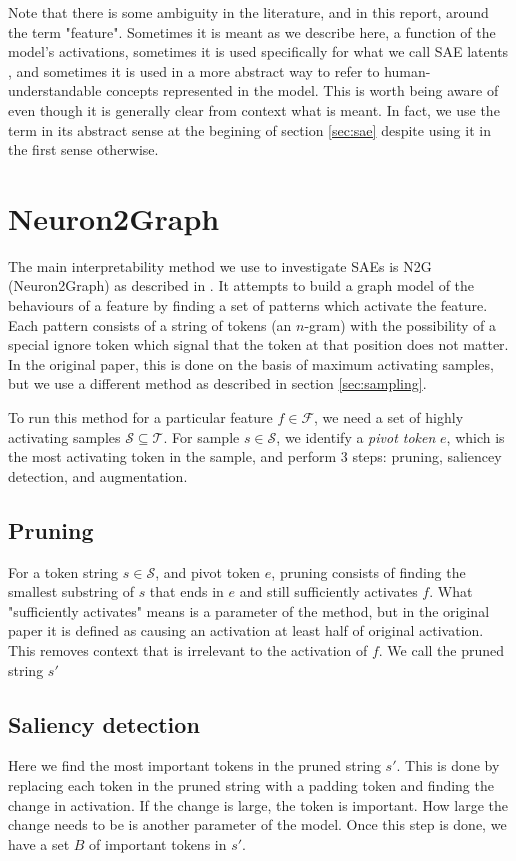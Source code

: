 Note that there is some ambiguity in the literature, and in this report, around the term "feature".
Sometimes it is meant as we describe here, a function of the model's activations, sometimes it is used specifically for what we call SAE latents \parencite{templeton_scaling_2024}, and sometimes it is used in a more abstract way to refer to human-understandable concepts represented in the model.
This is worth being aware of even though it is generally clear from context what is meant.
In fact, we use the term in its abstract sense at the begining of section \ref{sec:sae} despite using it in the first sense otherwise.

\section{Neuron2Graph}
\label{sec:n2g}
The main interpretability method we use to investigate SAEs is N2G (Neuron2Graph)
as described in \cite{foote_neuron_2023}.
It attempts to build a graph model of the behaviours of a feature 
by finding a set of patterns which activate the feature.
Each pattern consists of a string of tokens (an $n$-gram) 
with the possibility of a special ignore token 
which signal that the token at that position does not matter.
In the original paper, this is done on the basis of maximum activating samples, but we use a different method as described in section \ref{sec:sampling}.

To run this method for a particular feature $f\in\mathcal{F}$, 
we need a set of highly activating samples $\mathcal S\subseteq \mathcal T$.
For sample $s\in\mathcal S$, we identify a \emph{pivot token} $e$, 
which is the most activating token in the sample, 
and perform 3 steps: pruning, saliencey detection, and augmentation.

\subsection{Pruning}
For a token string $s\in\mathcal S$, and pivot token $e$, 
pruning consists of finding the smallest substring of $s$ that ends in $e$ 
and still sufficiently activates $f$.
What "sufficiently activates" means is a parameter of the method, 
but in the original paper it is defined as causing an activation at least
half of original activation.
This removes context that is irrelevant to the activation of $f$.
We call the pruned string $s'$

\subsection{Saliency detection}
Here we find the most important tokens in the pruned string $s'$.
This is done by replacing each token in the pruned string 
with a padding token and finding the change in activation.
If the change is large, the token is important.
How large the change needs to be is another parameter of the model.
Once this step is done, we have a set $B$ of important tokens in $s'$.

